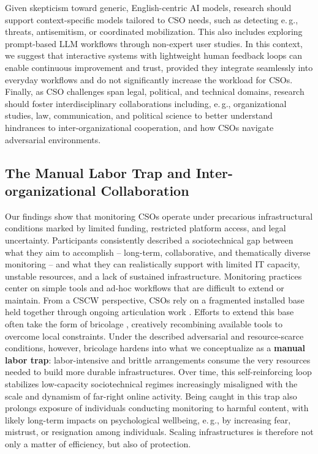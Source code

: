 \documentclass[acmsmall]{acmart}
\begin{document}
Given skepticism toward generic, English-centric AI models, research should support context-specific models tailored to CSO needs, such as detecting e.\,g., threats, antisemitism, or coordinated mobilization. This also includes exploring prompt-based LLM workflows through non-expert user studies.
In this context, we suggest that interactive systems with lightweight human feedback loops can enable continuous improvement and trust, provided they integrate seamlessly into everyday workflows and do not significantly increase the workload for CSOs.
Finally, as CSO challenges span legal, political, and technical domains, research should foster interdisciplinary collaborations including, e.\,g., organizational studies, law, communication, and political science to better understand hindrances to inter-organizational cooperation, and how CSOs navigate adversarial environments. 



\subsection{The Manual Labor Trap and Inter-organizational Collaboration}

Our findings show that monitoring CSOs operate under precarious infrastructural conditions marked by limited funding, restricted platform access, and legal uncertainty. Participants consistently described a sociotechnical gap between what they aim to accomplish -- long-term, collaborative, and thematically diverse monitoring -- and what they can realistically support with limited IT capacity, unstable resources, and a lack of sustained infrastructure. Monitoring practices center on simple tools and ad-hoc workflows that are difficult to extend or maintain. From a CSCW perspective, CSOs rely on a fragmented installed base \cite{star_steps_1994,neumann_making_1996} held together through ongoing articulation work \cite{schmidt_taking_2011}. Efforts to extend this base often take the form of bricolage \cite{buscher_landscapes_2001,karanasios_digital_2022}, creatively recombining available tools to overcome local constraints. Under the described adversarial and resource-scarce conditions, however, bricolage hardens into what we conceptualize as a \textbf{manual labor trap}: labor-intensive and brittle arrangements consume the very resources needed to build more durable infrastructures. Over time, this self-reinforcing loop stabilizes low-capacity sociotechnical regimes increasingly misaligned with the scale and dynamism of far-right online activity. Being caught in this trap also prolongs exposure of individuals conducting monitoring to harmful content, with likely long-term impacts on psychological wellbeing, e.\,g., by increasing fear, mistrust, or resignation among individuals. Scaling infrastructures is therefore not only a matter of efficiency, but also of protection.
\end{document}
